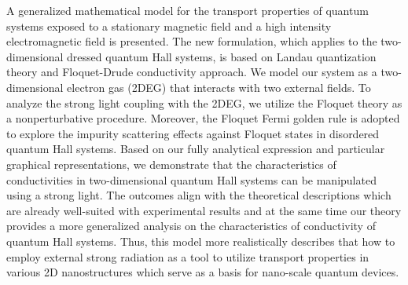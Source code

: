 A generalized mathematical model for the transport properties of quantum systems exposed to a stationary magnetic field and a high intensity electromagnetic field is presented. The new formulation, which applies to the two-dimensional dressed quantum Hall systems, is based on Landau quantization theory and Floquet-Drude conductivity approach. We model our system as a two-dimensional electron gas (2DEG) that interacts with two external fields. To analyze the strong light coupling with the 2DEG, we utilize the Floquet theory as a nonperturbative procedure. Moreover, the Floquet Fermi golden rule is adopted to explore the impurity scattering effects against Floquet states in disordered quantum Hall systems. Based on our fully analytical expression and particular graphical representations, we demonstrate that the characteristics of conductivities in two-dimensional quantum Hall systems can be manipulated using a strong light. The outcomes align with the theoretical descriptions which are already well-suited with experimental results and at the same time our theory provides a more generalized analysis on the characteristics of conductivity of quantum Hall systems. Thus, this model more realistically describes that how to employ external strong radiation as a tool to utilize transport properties in various 2D nanostructures which serve as a basis for nano-scale quantum devices.
